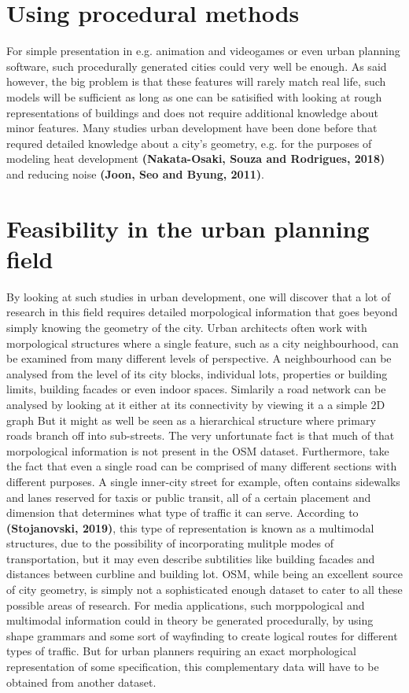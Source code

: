 \documentclass{kththesis}
\begin{document}
\section{Using procedural methods}

For simple presentation in e.g. animation and videogames or even urban planning software, such procedurally generated cities could very well be enough.
As said however, the big problem is that these features will rarely match real life, such models will be sufficient as long as one can be satisified with looking at rough representations of buildings and does not require additional knowledge about minor features.
Many studies urban development have been done before that requred detailed knowledge about a city's geometry, e.g. for the purposes of modeling heat development
\textbf{(Nakata-Osaki, Souza and Rodrigues, 2018)}
and reducing noise
\textbf{(Joon, Seo and Byung, 2011)}.

\section{Feasibility in the urban planning field}
By looking at such studies in urban development, one will discover that a lot of research in this field requires detailed morpological information that goes beyond simply knowing the geometry of the city.
Urban architects often work with morpological structures where a single feature, such as a city neighbourhood, can be examined from many different levels of perspective.
A neighbourhood can be analysed from the level of its city blocks, individual lots, properties or building limits, building facades or even indoor spaces.
Simlarily a road network can be analysed by looking at it either at its connectivity by viewing it a a simple 2D graph
But it might as well be seen as a hierarchical structure where primary roads branch off into sub-streets. 
The very unfortunate fact is that much of that morpological information is not present in the OSM dataset.
Furthermore, take the fact that even a single road can be comprised of many different sections with different purposes.
A single inner-city street for example, often contains sidewalks and lanes reserved for taxis or public transit, all of a certain placement and dimension that determines what type of traffic it can serve.
According to \textbf{(Stojanovski, 2019)}, this type of representation is known as a multimodal structures, due to the possibility of incorporating mulitple modes of transportation, but it may even describe subtilities like building facades and distances between curbline and building lot.
OSM, while being an excellent source of city geometry, is simply not a sophisticated enough dataset to cater to all these possible areas of research.
For media applications, such morppological and multimodal information could in theory be generated procedurally, by using shape grammars and some sort of wayfinding to create logical routes for different types of traffic.
But for urban planners requiring an exact morphological representation of some specification, this complementary data will have to be obtained from another dataset.
\end{document}
